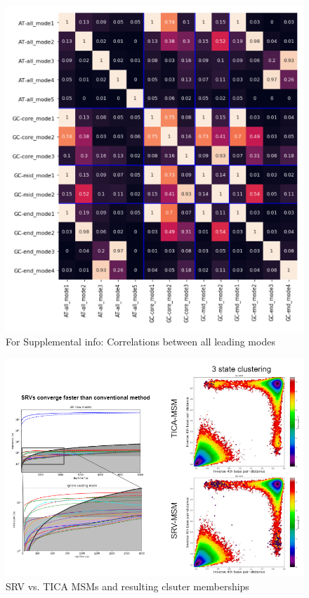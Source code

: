 \documentclass[journal=jpcbfk,manuscript=article]{achemso}
\begin{document}
\begin{figure}[ht!]
	\begin{center}
        \includegraphics[width=\textwidth]{Figs/skeleton/all_modes_correlations.PNG}
        \caption{For Supplemental info: Correlations between all leading modes}
        \label{fig:all_modes}
	\end{center}
\end{figure}

\begin{figure}[ht!]
	\begin{center}
        \includegraphics[width=\textwidth]{Figs/skeleton/tica_comparison_GC-core.PNG}
        \caption{SRV vs. TICA MSMs and resulting clsuter memberships}
        \label{fig:tica_comparison}
	\end{center}
\end{figure}
\end{document}
